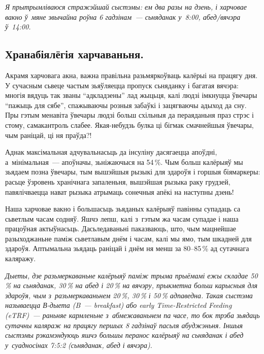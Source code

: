\emph{Я прытрымліваюся стражэйшай сыстэмы: ем два разы на дзень, і харчовае вакно ў~мяне звычайна роўна 6 гадзінам~--- сьняданак у~8:00, абед/вячэра ў~14:00.}


\subsection*{Хранабіялёгія харчаваньня.}
Акрамя харчовага акна, важна правільна разьмяркоўваць калёрыі на працягу дня. У сучасным сьвеце частым зьяўляецца пропуск сьняданку і багатая вячэра: многія вядуць так званы ``адкладзены'' лад жыцьця, калі людзі імкнуцца ўвечары ``пажыць для сябе'', спажываючы розныя забаўкі і зацягваючы адыход да сну. Пры гэтым менавіта ўвечары людзі больш схільныя да пераяданьня праз стрэс і стому, самакантроль слабее. Якая-небудзь булка ці бігмак смачнейшыя ўвечары, чым раніцай, ці ня праўда?!

Аднак максімальная адчувальнасьць да інсуліну дасягаецца апоўдні, а~мінімальная~--- апоўначы, зьніжаючыся на 54\,\%. Чым больш калёрыяў мы зьядаем позна ўвечары, тым вышэйшыя рызыкі для здароўя і горшыя біямаркеры: расьце ўзровень хранічнага запаленьня, вышэйшая рызыка раку грудзей, павялічваецца нават рызыка атрымаць сонечныя апёкі на наступны дзень!

Наша харчовае вакно і большасьць зьяданых калёрыяў павінны супадаць са сьветлым часам содняў. Яшчэ лепш, калі з~гэтым жа часам супадае і наша працоўная актыўнасьць. Дасьледаваньні паказваюць, што, чым мацнейшае разыходжаньне паміж сьветлавым днём і часам, калі мы ямо, тым шкадней для здароўя. Аптымальна зьядаць раніцай і днём ня менш за 80--85\,\% ад сутачнага каляражу.

\emph{Дыеты, дзе разьмеркаваньне калёрыяў паміж трыма прыёмамі ежы складае 50\,\% на сьняданак, 30\,\% на абед і 20\,\% на вячэру, прыкметна больш карысныя для здароўя, чым з~разьмеркаваньнем 20\,\%, 30\,\% і 50\,\% адпаведна. Такая сыстэма называецца В-дыета (B~--- breakfast) або early Time-Restricted Feeding (eTRF)~--- раньняе кармленьне з~абмежаваньнем па часе, то бок трэба зьядаць сутачны каляраж на працягу першых 8 гадзінаў пасьля абуджэньня. Іншыя сыстэмы рэкамэндуюць яшчэ большы перанос калёрыяў на сьняданак і абед у~суадносінах 7:5:2 (сьняданак, абед і вячэра).}

